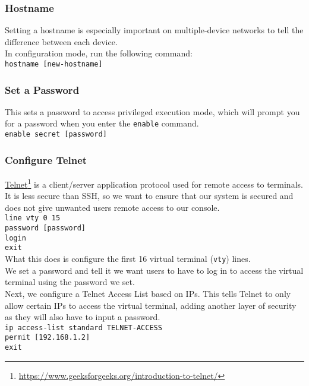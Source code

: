 \documentclass{ol-softwaremanual}
\newcommand{\doclink}[2]{\href{#1}{#2}\footnote{\url{#1}}}
\begin{document}
            \subsubsection{Hostname}\label{subsubsec:hostname}
            Setting a hostname is especially important on multiple-device networks to tell the difference between each device.\\
            In configuration mode, run the following command:\\
            \verb|hostname [new-hostname]|

            \subsubsection{Set a Password}\label{subsubsec:passwrd}
            This sets a password to access privileged execution mode, which will prompt you for a password when you enter the \verb|enable| command.\\
            \verb|enable secret [password]|

            \subsubsection{Configure Telnet}
            \doclink{https://www.geeksforgeeks.org/introduction-to-telnet/}{Telnet} is a client/server application protocol used for remote access to terminals.\\
            It is less secure than SSH, so we want to ensure that our system is secured and does not give unwanted users remote access to our console.\\
            \verb|line vty 0 15|\\
            \verb|password [password]|\\
            \verb|login|\\
            \verb|exit|\\
            What this does is configure the first 16 virtual terminal (\verb|vty|) lines.\\
            We set a password and tell it we want users to have to log in to access the virtual terminal using the password we set.\\
            Next, we configure a Telnet Access List based on IPs. This tells Telnet to only allow certain IPs to access the virtual terminal, adding another layer of security as they will also have to input a password.\\
            \verb|ip access-list standard TELNET-ACCESS|\\
            \verb|permit [192.168.1.2]|\\
            \verb|exit|\\
\end{document}
